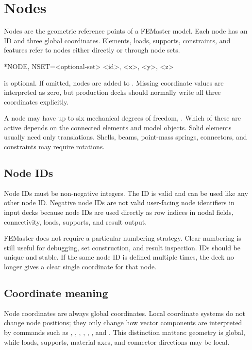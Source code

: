 \chapter{Nodes}

Nodes are the geometric reference points of a FEMaster model. Each node has an ID and three global coordinates. Elements, loads, supports, constraints, and features refer to nodes either directly or through node sets.

\begin{syntax}
*NODE, NSET=<optional-set>
<id>, <x>, <y>, <z>
\end{syntax}

 is optional. If omitted, nodes are added to . Missing coordinate values are interpreted as zero, but production decks should normally write all three coordinates explicitly.

A node may have up to six mechanical degrees of freedom, \dofvec. Which of these are active depends on the connected elements and model objects. Solid elements usually need only translations. Shells, beams, point-mass springs, connectors, and constraints may require rotations.

\section{Node IDs}

Node IDs must be non-negative integers. The ID  is valid and can be used like any other node ID. Negative node IDs are not valid user-facing node identifiers in input decks because node IDs are used directly as row indices in nodal fields, connectivity, loads, supports, and result output.

FEMaster does not require a particular numbering strategy. Clear numbering is still useful for debugging, set construction, and result inspection. IDs should be unique and stable. If the same node ID is defined multiple times, the deck no longer gives a clear single coordinate for that node.

\section{Coordinate meaning}

Node coordinates are always global coordinates. Local coordinate systems do not change node positions; they only change how vector components are interpreted by commands such as , , , , , , and . This distinction matters: geometry is global, while loads, supports, material axes, and connector directions may be local.

